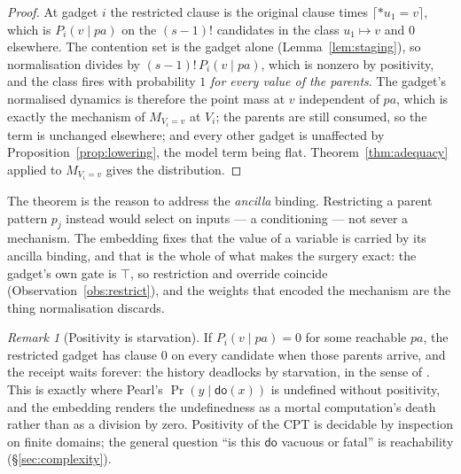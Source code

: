 \documentclass[11pt,a4paper]{article}
\theoremstyle{plain}
\theoremstyle{definition}
\theoremstyle{remark}
\newtheorem{remark}[theorem]{Remark}
\newcommand{\crisp}[1]{\lceil #1 \rceil}
\newcommand{\dok}{\textsf{do}}
\begin{document}
\begin{proof}
At gadget $i$ the restricted clause is the original clause times
$\crisp{*u_1 = v}$, which is $P_i(v \mid \mathit{pa})$ on the $(s-1)!$
candidates in the class $u_1 \mapsto v$ and $0$ elsewhere. The contention set is
the gadget alone (Lemma~\ref{lem:staging}), so normalisation divides by
$(s-1)!\,P_i(v \mid \mathit{pa})$, which is nonzero by positivity, and the class
fires with probability $1$ \emph{for every value of the parents}. The gadget's
normalised dynamics is therefore the point mass at $v$ independent of
$\mathit{pa}$, which is exactly the mechanism of $M_{V_i=v}$ at $V_i$; the
parents are still consumed, so the term is unchanged elsewhere; and every other
gadget is unaffected by Proposition~\ref{prop:lowering}, the model term being
flat. Theorem~\ref{thm:adequacy} applied to $M_{V_i=v}$ gives the distribution.
\end{proof}

The theorem is the reason to address the \emph{ancilla} binding. Restricting a
parent pattern $p_j$ instead would select on inputs --- a conditioning --- not
sever a mechanism. The embedding fixes that the value of a variable is carried
by its ancilla binding, and that is the whole of what makes the surgery exact:
the gadget's own gate is $\top$, so restriction and override coincide
(Observation~\ref{obs:restrict}), and the weights that encoded the mechanism are
the thing normalisation discards.

\begin{remark}[Positivity is starvation]\label{rem:positivity}
If $P_i(v \mid \mathit{pa}) = 0$ for some reachable $\mathit{pa}$, the
restricted gadget has clause $0$ on every candidate when those parents arrive,
and the receipt waits forever: the history deadlocks by starvation, in the sense
of \cite{ProofSearch}. This is exactly where Pearl's $\Pr(y \mid \dok(x))$ is
undefined without positivity, and the embedding renders the undefinedness as a
mortal computation's death rather than as a division by zero. Positivity of
the CPT is decidable by inspection on finite domains; the general question
``is this $\dok$ vacuous or fatal'' is reachability (\S\ref{sec:complexity}).
\end{remark}
\end{document}
